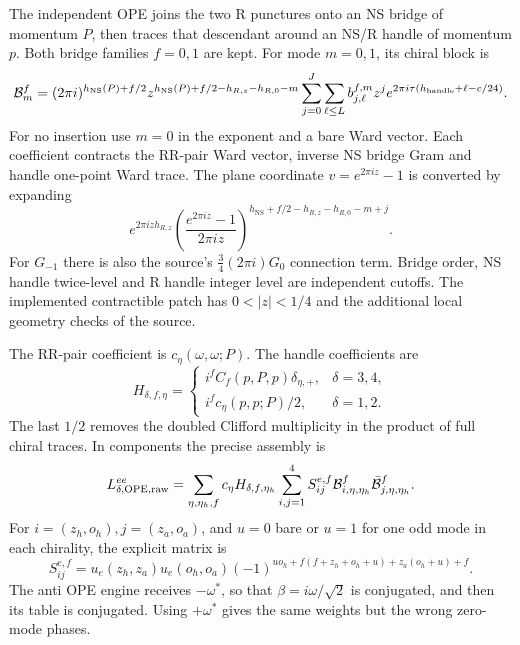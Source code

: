 \documentclass[11pt]{article}
\newcommand{\NS}{\mathrm{NS}}
\begin{document}
The independent OPE joins the two R punctures onto an NS bridge
of momentum \(P\), then traces that descendant around an NS/R
handle of momentum \(p\). Both bridge families \(f=0,1\) are kept.
For mode \(m=0,1\), its chiral block is
\begin{equation}
 {\cal B}^{f}_{m}=
 (2\pi i)^{h_\NS(P)+f/2}
 z^{h_\NS(P)+f/2-h_{R,z}-h_{R,0}-m}
 \sum_{j=0}^{J}\sum_{\ell\le L}
 b^{f,m}_{j,\ell}z^j e^{2\pi i\tau(h_{\rm handle}+\ell-c/24)}.
 \label{eq:ope}
\end{equation}
For no insertion use \(m=0\) in the exponent and a bare Ward vector.
Each coefficient contracts the RR-pair Ward vector, inverse NS
bridge Gram and handle one-point Ward trace.
The plane coordinate \(v=e^{2\pi iz}-1\) is converted by expanding
\[
 e^{2\pi izh_{R,z}}
 \left(\frac{e^{2\pi iz}-1}{2\pi iz}\right)^{
        h_\NS+f/2-h_{R,z}-h_{R,0}-m+j}.
\]
For \(G_{-1}\) there is also the source's
\(\frac34(2\pi i)G_0\) connection term. Bridge order, NS handle
twice-level and R handle integer level are independent cutoffs.
The implemented contractible patch has \(0<|z|<1/4\) and the
additional local geometry checks of the source.

The RR-pair coefficient is \(c_\eta(\omega,\omega;P)\).
The handle coefficients are
\begin{equation}
 H_{\delta,f,\eta}=
 \begin{cases}
 i^f C_f(p,P,p)\delta_{\eta,+},&\delta=3,4,\\
 i^f c_\eta(p,p;P)/2,&\delta=1,2.
 \end{cases}
\end{equation}
The last \(1/2\) removes the doubled Clifford multiplicity in the
product of full chiral traces. In components the precise assembly is
\begin{equation}
 L^{ee}_{\delta,\rm OPE,raw}=
 \sum_{\eta,\eta_h,f}c_\eta H_{\delta,f,\eta_h}
 \sum_{i,j=1}^4 S^{e,f}_{ij}
 {\cal B}^{f}_{i,\eta,\eta_h}\bar{\cal B}^{f}_{j,\eta,\eta_h}.
\end{equation}
For \(i=(z_h,o_h),j=(z_a,o_a)\), and \(u=0\) bare or \(u=1\)
for one odd mode in each chirality, the explicit matrix is
\[
 S^{e,f}_{ij}=u_e(z_h,z_a)u_e(o_h,o_a)
 (-1)^{u o_h+f(f+z_h+o_h+u)+z_a(o_h+u)+f}.
\]
The anti OPE engine receives \(-\omega^*\), so that
\(\beta=i\omega/\sqrt2\) is conjugated, and then its table is
conjugated. Using \(+\omega^*\) gives the same weights but the
wrong zero-mode phases.
\end{document}
